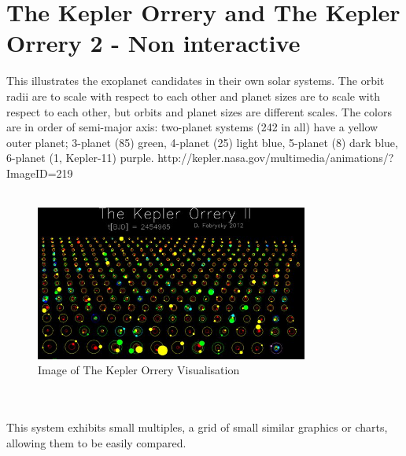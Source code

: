 \documentclass[11pt
              , a4paper
              , twoside
              , openright
              ]{report}
\begin{document}
\section{The Kepler Orrery and The Kepler Orrery 2 - Non interactive}
This illustrates the exoplanet candidates in their own solar systems. The orbit radii are to scale with respect to each other and planet sizes are to scale with respect to each other, but orbits and planet sizes are different scales. The colors are in order of semi-major axis: two-planet systems (242 in all) have a yellow outer planet; 3-planet (85) green, 4-planet (25) light blue, 5-planet (8) dark blue, 6-planet (1, Kepler-11) purple. http://kepler.nasa.gov/multimedia/animations/?ImageID=219
\\\\
\begin{figure}[h!]
  \centering
      \includegraphics[width=0.8\textwidth]{images/orrery.jpg}
  \caption{Image of The Kepler Orrery Visualisation}
\end{figure}
\\\\
This system exhibits small multiples, a grid of small similar graphics or charts, allowing them to be easily compared.
\end{document}
